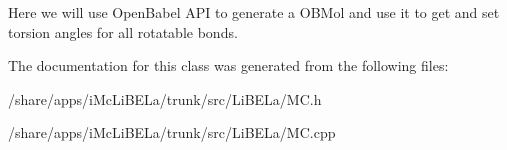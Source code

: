 Here we will use OpenBabel API to generate a OBMol and use it to get and set torsion angles for all rotatable bonds.

The documentation for this class was generated from the following files:\begin{DoxyCompactItemize}
\item 
/share/apps/iMcLiBELa/trunk/src/LiBELa/MC.h\item 
/share/apps/iMcLiBELa/trunk/src/LiBELa/MC.cpp\end{DoxyCompactItemize}
